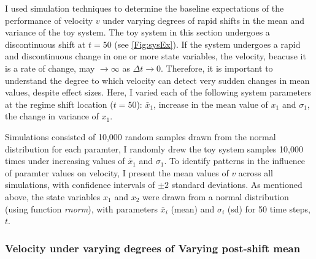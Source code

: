 \documentclass[12pt,twoside,openany]{reedthesis}
\begin{document}
I used simulation techniques to determine the baseline expectations of the performance of velocity \(v\) under varying degrees of rapid shifts in the mean and variance of the toy system. The toy system in this section undergoes a discontinuous shift at \(t = 50\) (see \ref{Fig:sysEx}). If the system undergoes a rapid and discontinuous change in one or more state variables, the velocity, beacuse it is a rate of change, may \(\rightarrow \infty\) as \(\Delta t \rightarrow 0\). Therefore, it is important to understand the degree to which velocity can detect very sudden changes in mean values, despite effect sizes. Here, I varied each of the following system parameters at the regime shift location (\(t=50\)): \(\bar{x}_1\), increase in the mean value of \(x_1\) and \(\sigma_1\), the change in variance of \(x_1\).

Simulations consisted of 10,000 random samples drawn from the normal distribution for each paramter, I randomly drew the toy system samples 10,000 times under increasing values of \(\bar{x}_1\) and \(\sigma_1\). To identify patterns in the influence of paramter values on velocity, I present the mean values of \(v\) across all simulations, with confidence intervals of \(\pm 2\) standard deviations. As mentioned above, the state variables \(x_1\) and \(x_2\) were drawn from a normal distribution (using function \emph{rnorm}), with parameters \(\bar{x}_i\) (mean) and \(\sigma_i\) (sd) for 50 time steps, \(t\).

\hypertarget{velocity-under-varying-degrees-of-varying-post-shift-mean}{%
\subsubsection{Velocity under varying degrees of Varying post-shift mean}\label{velocity-under-varying-degrees-of-varying-post-shift-mean}}
\end{document}
